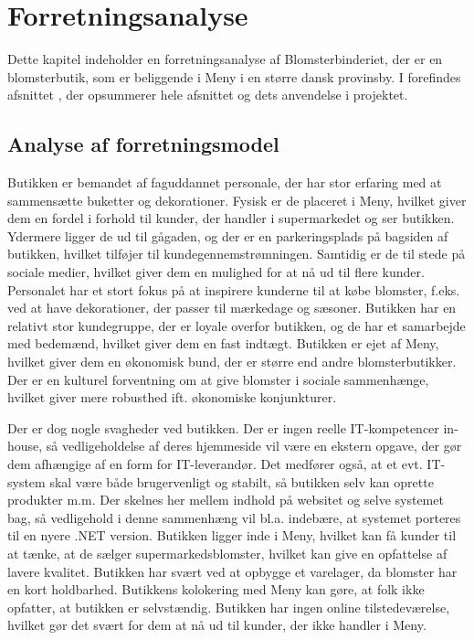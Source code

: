 \chapter{Forretningsanalyse}
\label{chapter:forretningsanalyse}

Dette kapitel indeholder en forretningsanalyse af Blomsterbinderiet, der er en blomsterbutik, som er beliggende i Meny i en større dansk provinsby.
I  forefindes afsnittet , der opsummerer hele afsnittet og dets anvendelse i projektet.

\section{Analyse af forretningsmodel}
Butikken er bemandet af faguddannet personale, der har stor erfaring med at sammensætte buketter og dekorationer. 
Fysisk er de placeret i Meny, hvilket giver dem en fordel i forhold til kunder, der handler i supermarkedet og ser butikken. Ydermere ligger de ud til gågaden, og der er en parkeringsplads på bagsiden af butikken, hvilket tilføjer til kundegennemstrømningen. 
Samtidig er de til stede på sociale medier, hvilket giver dem en mulighed for at nå ud til flere kunder.
Personalet har et stort fokus på at inspirere kunderne til at købe blomster, f.eks. ved at have dekorationer, der passer til mærkedage og sæsoner. 
Butikken har en relativt stor kundegruppe, der er loyale overfor butikken, og de har et samarbejde med bedemænd, hvilket giver dem en fast indtægt. 
Butikken er ejet af Meny, hvilket giver dem en økonomisk bund, der er større end andre blomsterbutikker.
Der er en kulturel forventning om at give blomster i sociale sammenhænge, hvilket giver mere robusthed ift. økonomiske konjunkturer.

Der er dog nogle svagheder ved butikken. 
Der er ingen reelle IT-kompetencer in-house, så vedligeholdelse af deres hjemmeside vil være en ekstern opgave, der gør dem afhængige af en form for IT-leverandør.
Det medfører også, at et evt. IT-system skal være både brugervenligt og stabilt, så butikken selv kan oprette produkter m.m. 
Der skelnes her mellem indhold på websitet og selve systemet bag, så vedligehold i denne sammenhæng vil bl.a. indebære, at systemet porteres til en nyere .NET version.
Butikken ligger inde i Meny, hvilket kan få kunder til at tænke, at de sælger supermarkedsblomster, hvilket kan give en opfattelse af lavere kvalitet.
Butikken har svært ved at opbygge et varelager, da blomster har en kort holdbarhed.
Butikkens kolokering med Meny kan gøre, at folk ikke opfatter, at butikken er selvstændig.
Butikken har ingen online tilstedeværelse, hvilket gør det svært for dem at nå ud til kunder, der ikke handler i Meny.

